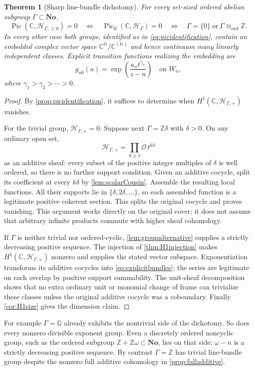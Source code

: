 \documentclass[11pt,letterpaper]{article}
\newtheorem{theorem}{Theorem}[section]
\theoremstyle{definition}
\theoremstyle{remark}
\newcommand{\C}{\mathbb C}
\newcommand{\N}{\mathbb N}
\newcommand{\Z}{\mathbb Z}
\newcommand{\Q}{\mathbb Q}
\newcommand{\No}{\mathbf{No}}
\newcommand{\OO}{\mathcal O}
\newcommand{\HH}{\mathscr H_\Gamma}
\newcommand{\HP}{\mathscr H_{\Gamma,+}}
\newcommand{\HA}{\mathscr H_{\Gamma,\ge0}}
\newcommand{\Piclf}{\operatorname{Pic}_{\mathrm{lf}}}
\numberwithin{equation}{section}
\begin{document}
\begin{theorem}[Sharp line-bundle dichotomy]\label{thm:picdichotomy}
For every set-sized ordered abelian subgroup $\Gamma\subset\No$,
\begin{equation}\label{eq:picdichotomy}
 \operatorname{Pic}(\C,\HA)=0
 \quad\Longleftrightarrow\quad
 \Piclf(\C,\HH)=0
 \quad\Longleftrightarrow\quad
 \Gamma=\{0\}\ \text{or}\ \Gamma\cong_{\mathrm{ord}}\Z.
\end{equation}
In every other case both groups, identified as in \eqref{eq:picidentification}, contain an embedded complex vector space $\C^{\N}/\C^{(\N)}$ and hence continuum many linearly independent classes. Explicit transition functions realizing the embedding are
\begin{equation}\label{eq:explicitbundles}
 g_{n0}(a)=\exp\left(\frac{a_nt^{\gamma_n}}{z-n}\right)
 \quad\text{on }W_n,
\end{equation}
where $\gamma_1>\gamma_2>\cdots>0$.
\end{theorem}
\begin{proof}
By \cref{prop:picidentification}, it suffices to determine when $H^1(\C,\HP)$ vanishes.

For the trivial group, $\HP=0$. Suppose next $\Gamma=\Z\delta$ with $\delta>0$. On any ordinary open set,
\[
 \HP=\prod_{k\ge1}\OO\,t^{k\delta}
\]
as an additive sheaf: every subset of the positive integer multiples of $\delta$ is well ordered, so there is no further support condition. Given an additive cocycle, split its coefficient at every $k\delta$ by \cref{lem:scalarCousin}. Assemble the resulting local functions. All their supports lie in $\{\delta,2\delta,\ldots\}$, so each assembled function is a legitimate positive coherent section. This splits the original cocycle and proves vanishing. This argument works directly on the original cover; it does not assume that arbitrary infinite products commute with higher sheaf cohomology.

If $\Gamma$ is neither trivial nor ordered-cyclic, \cref{lem:groupalternative} supplies a strictly decreasing positive sequence. The injection of \cref{thm:H1injection} makes $H^1(\C,\HP)$ nonzero and supplies the stated vector subspace. Exponentiation transforms its additive cocycles into \eqref{eq:explicitbundles}; the series are legitimate on each overlap by positive support summability. The unit-sheaf decomposition shows that no extra ordinary unit or monomial change of frame can trivialize these classes unless the original additive cocycle was a coboundary. Finally \cref{cor:H1size} gives the dimension claim.
\end{proof}
For example $\Gamma=\Q$ already exhibits the nontrivial side of the dichotomy. So does every nonzero divisible exponent group. Even a discretely ordered noncyclic group, such as the ordered subgroup $\Z+\Z\omega\subset\No$, lies on that side: $\omega-n$ is a strictly decreasing positive sequence. By contrast $\Gamma=\Z$ has trivial line-bundle group despite the nonzero full additive cohomology in \cref{prop:fulladditive}.
\end{document}
